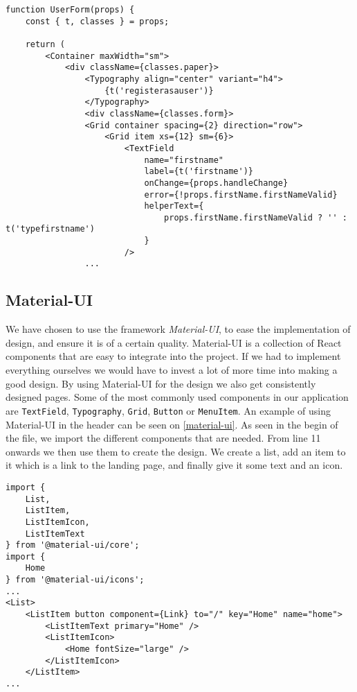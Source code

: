 \begin{lstlisting}[caption={Presentational component for userform}, captionpos=b, label={user-form}]
function UserForm(props) {
    const { t, classes } = props;
    
    return (
        <Container maxWidth="sm">
            <div className={classes.paper}>
                <Typography align="center" variant="h4">
                    {t('registerasauser')}
                </Typography>
                <div className={classes.form}>
                <Grid container spacing={2} direction="row">
                    <Grid item xs={12} sm={6}>
                        <TextField
                            name="firstname"
                            label={t('firstname')}
                            onChange={props.handleChange}
                            error={!props.firstName.firstNameValid}
                            helperText={
                                props.firstName.firstNameValid ? '' : t('typefirstname')
                            }
                        />
                ...
\end{lstlisting}






\subsection{Material-UI}
We have chosen to use the framework \textit{Material-UI}, to ease the implementation of design, and ensure it is of a certain quality.
Material-UI is a collection of React components that are easy to integrate into the project.
If we had to implement everything ourselves we would have to invest a lot of more time into making a good design.
By using Material-UI for the design we also get consistently designed pages.
Some of the most commonly used components in our application are \texttt{TextField}, \texttt{Typography}, \texttt{Grid}, \texttt{Button} or \texttt{MenuItem}.
An example of using Material-UI in the header can be seen on \autoref{material-ui}.
As seen in the begin of the file, we import the different components that are needed.
From line 11 onwards we then use them to create the design.
We create a list, add an item to it which is a link to the landing page, and finally give it some text and an icon.
\begin{lstlisting}[caption={Use of material-ui in the header}, captionpos=b, label={material-ui}]
import {
    List,
    ListItem,
    ListItemIcon,
    ListItemText
} from '@material-ui/core';
import {
	Home
} from '@material-ui/icons';
...
<List>
    <ListItem button component={Link} to="/" key="Home" name="home">
        <ListItemText primary="Home" />
        <ListItemIcon>
            <Home fontSize="large" />
        </ListItemIcon>
    </ListItem>
...
\end{lstlisting}
